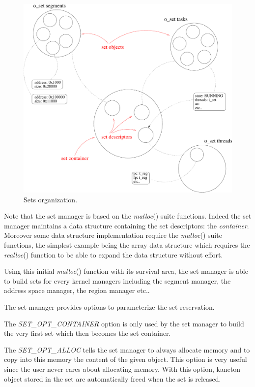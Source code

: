 \begin{figure}[h]
  \begin{center}
    \includegraphics[scale=0.5]{figures/core_sets.pdf}
    \caption{Sets organization.}
    \label{figure:core_sets}
  \end{center}
\end{figure}

Note that the set manager is based on the \textit{malloc}() suite functions.
Indeed the set manager maintains a data structure containing the set
descriptors: the \textit{container}. Moreover some data structure
implementation require the \textit{malloc}() suite functions, the simplest
example being the array data structure which requires the \textit{realloc}()
function to be able to expand the data structure without effort.

Using this initial \textit{malloc}() function with its survival area,
the set manager is able to build sets for every kernel managers including
the segment manager, the address space manager, the region manager etc..

The set manager provides options to parameterize the set reservation.

The \textit{SET\_OPT\_CONTAINER} option is only used by the set manager
to build the very first set which then becomes the set container.

The \textit{SET\_OPT\_ALLOC} tells the set manager to always allocate
memory and to copy into this memory the content of the given object.
This option is very useful since the user never cares about allocating
memory. With this option, kaneton object stored in the set are automatically
freed when the set is released.

